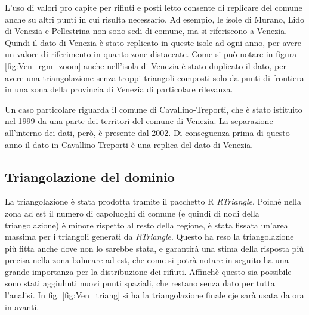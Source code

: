 \documentclass[a4paper,11pt,twoside,openright]{book}							%
\begin{document}
L'uso di valori pro capite per rifiuti e posti letto consente di replicare del comune anche su altri punti in cui risulta necessario. Ad esempio, le isole di Murano, Lido di Venezia e Pellestrina non sono sedi di comune, ma si riferiscono a Venezia. Quindi il dato di Venezia è stato replicato in queste isole ad ogni anno, per avere un valore di riferimento in quanto zone distaccate. Come si può notare in figura \ref{fig:Ven_rgm_zoom} anche nell'isola di Venezia è stato duplicato il dato, per avere una triangolazione  senza troppi triangoli composti solo da punti di frontiera in una zona della provincia di Venezia di particolare rilevanza.

Un caso particolare riguarda il comune di Cavallino-Treporti, che è stato istituito nel 1999 da una parte dei territori del comune di Venezia. La separazione all'interno dei dati, però, è presente dal 2002. Di conseguenza prima di questo anno il dato in Cavallino-Treporti è una replica del dato di Venezia.

\subsection{Triangolazione del dominio}

La triangolazione è stata prodotta tramite il pacchetto R \textit{RTriangle}. Poichè nella zona ad est il numero di capoluoghi di comune (e quindi di nodi della triangolazione) è minore rispetto al resto della regione, è stata fissata un'area massima per i triangoli generati da \textit{RTriangle}. Questo ha reso la triangolazione più fitta anche dove non lo sarebbe stata, e garantirà una stima della risposta più precisa nella zona balneare ad est, che come si potrà notare in seguito ha una grande importanza per la distribuzione dei rifiuti. Affinchè questo sia possibile sono stati aggiuhnti nuovi punti spaziali, che restano senza dato per tutta l'analisi. In fig. \ref{fig:Ven_triang} si ha la triangolazione finale cje sarà usata da ora in avanti.
\end{document}
